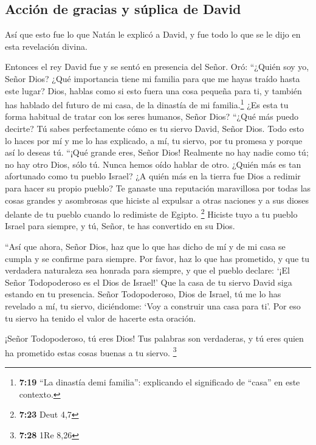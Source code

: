 \hypertarget{acciuxf3n-de-gracias-y-suxfaplica-de-david}{%
\subsection{Acción de gracias y súplica de
David}\label{acciuxf3n-de-gracias-y-suxfaplica-de-david}}

 Así que esto fue lo que Natán le explicó a David, y fue
todo lo que se le dijo en esta revelación divina.

 Entonces el rey David fue y se sentó en presencia del
Señor. Oró: ``¿Quién soy yo, Señor Dios? ¿Qué importancia tiene mi
familia para que me hayas traído hasta este lugar?  Dios,
hablas como si esto fuera una cosa pequeña para ti, y también has
hablado del futuro de mi casa, de la dinastía de mi familia.\footnote{\textbf{7:19}
  ``La dinastía demi familia'': explicando el significado de ``casa'' en
  este contexto.} ¿Es esta tu forma habitual de tratar con los seres
humanos, Señor Dios?  ``¿Qué más puedo decirte? Tú sabes
perfectamente cómo es tu siervo David, Señor Dios.  Todo
esto lo haces por mí y me lo has explicado, a mí, tu siervo, por tu
promesa y porque así lo deseas tú.  ``¡Qué grande eres,
Señor Dios! Realmente no hay nadie como tú; no hay otro Dios, sólo tú.
Nunca hemos oído hablar de otro.  ¿Quién más es tan
afortunado como tu pueblo Israel? ¿A quién más en la tierra fue Dios a
redimir para hacer su propio pueblo? Te ganaste una reputación
maravillosa por todas las cosas grandes y asombrosas que hiciste al
expulsar a otras naciones y a sus dioses delante de tu pueblo cuando lo
redimiste de Egipto. \footnote{\textbf{7:23} Deut 4,7} 
Hiciste tuyo a tu pueblo Israel para siempre, y tú, Señor, te has
convertido en su Dios.

 ``Así que ahora, Señor Dios, haz que lo que has dicho de
mí y de mi casa se cumpla y se confirme para siempre. Por favor, haz lo
que has prometido,  y que tu verdadera naturaleza sea
honrada para siempre, y que el pueblo declare: `¡El Señor Todopoderoso
es el Dios de Israel!' Que la casa de tu siervo David siga estando en tu
presencia.  Señor Todopoderoso, Dios de Israel, tú me lo
has revelado a mí, tu siervo, diciéndome: `Voy a construir una casa para
ti'. Por eso tu siervo ha tenido el valor de hacerte esta oración.

 ¡Señor Todopoderoso, tú eres Dios! Tus palabras son
verdaderas, y tú eres quien ha prometido estas cosas buenas a tu siervo.
\footnote{\textbf{7:28} 1Re 8,26}

